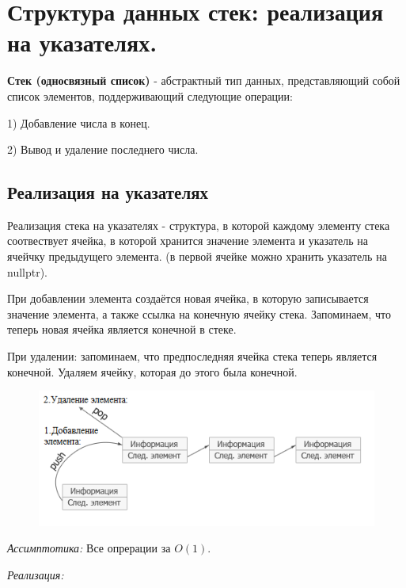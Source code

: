 \setcounter{section}{3}
\section{Структура данных стек: реализация на указателях.}

\textbf{Стек (односвязный список)} - абстрактный тип данных, представляющий собой список элементов, поддерживающий следующие операции: 

1) Добавление числа в конец.

2) Вывод и удаление последнего числа.

\subsection*{Реализация на указателях}

Реализация стека на указателях - структура, в которой каждому элементу стека соотвествует ячейка, в которой хранится значение элемента и указатель на ячейчку предыдущего элемента. (в первой ячейке можно хранить указатель на nullptr).

При добавлении элемента создаётся новая ячейка, в которую записывается значение элемента, а также ссылка на конечную ячейку стека. Запоминаем, что теперь новая ячейка является конечной в стеке.

При удалении: запоминаем, что предпоследняя ячейка стека теперь является конечной. Удаляем ячейку, которая до этого была конечной.

\begin{figure}[h]
\begin{center}
\includegraphics[width=0.7\linewidth]{images/2-5_stack_nodes}
\label{fig:mpr}
\end{center}
\end{figure}

\textit{Ассимптотика:} Все опрерации за $O(1)$.

\textit{Реализация:}



\setcounter{section}{4}
